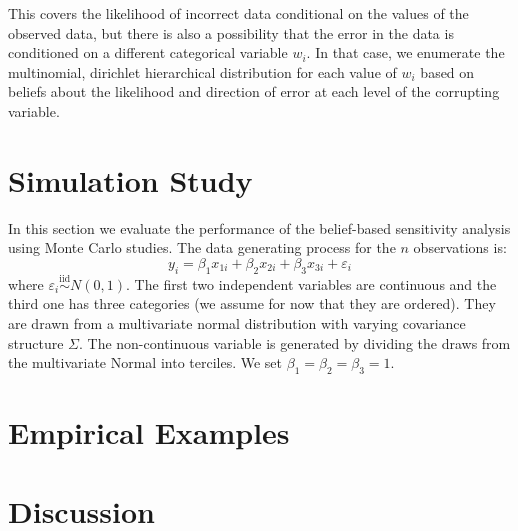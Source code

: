 \documentclass[fignum,letterpaper,12pt]{article}
\newcommand{\iid}{\stackrel{\mathrm{iid}}{\sim}}
\begin{document}
This covers the likelihood of incorrect data conditional on the values of the observed data, but there is also a possibility that the error in the data is conditioned on a different categorical variable $w_i$. In that case, we enumerate the multinomial, dirichlet hierarchical distribution for each value of $w_i$ based on beliefs about the likelihood and direction of error at each level of the corrupting variable.



\section{Simulation Study} \label{sec:simulation}

In this section we evaluate the performance of the belief-based sensitivity analysis using Monte Carlo studies. The data generating process for the $n$ observations is:
\begin{equation}
y_i = \beta_1 x_{1i }+ \beta_2 x_{2i} + \beta_3 x_{3i} + \varepsilon_i
\end{equation}
where $\varepsilon_i \iid N(0,1)$. The first two independent variables are continuous and the third one has three categories (we assume for now that they are ordered). They are drawn from a multivariate normal distribution with varying covariance structure $\Sigma$. The non-continuous variable is generated by dividing the draws from the multivariate Normal into terciles. We set $\beta_1=\beta_2=\beta_3=1$.



\section{Empirical Examples} \label{sec:examples}



\section{Discussion} \label{sec:conclusion}



\clearpage
\singlespacing
{}

\end{document}
